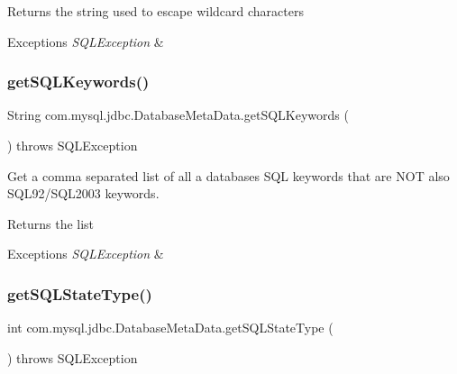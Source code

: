 \begin{DoxyReturn}{Returns}
the string used to escape wildcard characters 
\end{DoxyReturn}

\begin{DoxyExceptions}{Exceptions}
{\em S\+Q\+L\+Exception} & \\
\hline
\end{DoxyExceptions}
\mbox{\label{classcom_1_1mysql_1_1jdbc_1_1_database_meta_data_a82422ad5a2de2030bbb696fe529b92ca}} 
\subsubsection{\texorpdfstring{get\+S\+Q\+L\+Keywords()}{getSQLKeywords()}}
{\footnotesize\ttfamily String com.\+mysql.\+jdbc.\+Database\+Meta\+Data.\+get\+S\+Q\+L\+Keywords (\begin{DoxyParamCaption}{ }\end{DoxyParamCaption}) throws S\+Q\+L\+Exception}

Get a comma separated list of all a database\textquotesingle{}s S\+QL keywords that are N\+OT also S\+Q\+L92/\+S\+Q\+L2003 keywords.

\begin{DoxyReturn}{Returns}
the list 
\end{DoxyReturn}

\begin{DoxyExceptions}{Exceptions}
{\em S\+Q\+L\+Exception} & \\
\hline
\end{DoxyExceptions}
\mbox{\label{classcom_1_1mysql_1_1jdbc_1_1_database_meta_data_a75eb814c9d9198a66e8ebf6b78002833}} 
\subsubsection{\texorpdfstring{get\+S\+Q\+L\+State\+Type()}{getSQLStateType()}}
{\footnotesize\ttfamily int com.\+mysql.\+jdbc.\+Database\+Meta\+Data.\+get\+S\+Q\+L\+State\+Type (\begin{DoxyParamCaption}{ }\end{DoxyParamCaption}) throws S\+Q\+L\+Exception}

